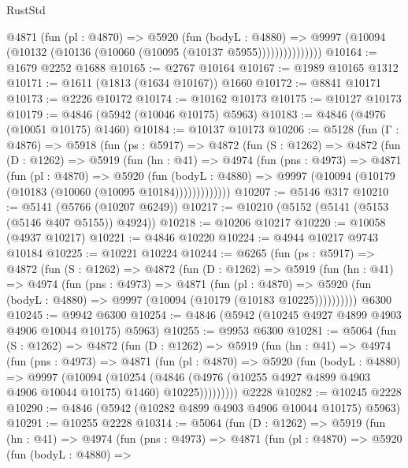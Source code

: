 \begin{lexlean}{RustStd}
\begin{coremodule}
                @4871
                  (fun (pl : @4870) =>
                  @5920
                    (fun (bodyL : @4880) =>
                    @9997 (@10094 (@10132 (@10136 (@10060 (@10095 (@10137 @5955)))))))))))))))
@10164 := @1679 @2252 @1688
@10165 := @2767 @10164
@10167 := @1989 @10165 @1312
@10171 := @1611 (@1813 (@1634 @10167)) @1660
@10172 := @8841 @10171
@10173 := @2226 @10172
@10174 := @10162 @10173
@10175 := @10127 @10173
@10179 := @4846 (@5942 (@10046 @10175) @5963)
@10183 := @4846 (@4976 (@10051 @10175) @1460)
@10184 := @10137 @10173
@10206 := @5128
    (fun (Γ : @4876) =>
    @5918
      (fun (ps : @5917) =>
      @4872
        (fun (S : @1262) =>
        @4872
          (fun (D : @1262) =>
          @5919
            (fun (hn : @41) =>
            @4974
              (fun (pns : @4973) =>
              @4871
                (fun (pl : @4870) =>
                @5920
                  (fun (bodyL : @4880) =>
                  @9997 (@10094 (@10179 (@10183 (@10060 (@10095 @10184)))))))))))))
@10207 := @5146 @317
@10210 := @5141 (@5766 (@10207 @6249))
@10217 := @10210 (@5152 (@5141 (@5153 (@5146 @407 @5155)) @4924))
@10218 := @10206 @10217
@10220 := @10058 (@4937 @10217)
@10221 := @4846 @10220
@10224 := @4944 @10217 @9743 @10184
@10225 := @10221 @10224
@10244 := @6265
    (fun (ps : @5917) =>
    @4872
      (fun (S : @1262) =>
      @4872
        (fun (D : @1262) =>
        @5919
          (fun (hn : @41) =>
          @4974
            (fun (pns : @4973) =>
            @4871
              (fun (pl : @4870) =>
              @5920 (fun (bodyL : @4880) => @9997 (@10094 (@10179 (@10183 @10225))))))))))
    @6300
@10245 := @9942 @6300
@10254 := @4846 (@5942 (@10245 @4927 @4899 @4903 @4906 @10044 @10175) @5963)
@10255 := @9953 @6300
@10281 := @5064
    (fun (S : @1262) =>
    @4872
      (fun (D : @1262) =>
      @5919
        (fun (hn : @41) =>
        @4974
          (fun (pns : @4973) =>
          @4871
            (fun (pl : @4870) =>
            @5920
              (fun (bodyL : @4880) =>
              @9997
                (@10094
                  (@10254
                    (@4846
                      (@4976 (@10255 @4927 @4899 @4903 @4906 @10044 @10175) @1460)
                      @10225)))))))))
    @2228
@10282 := @10245 @2228
@10290 := @4846 (@5942 (@10282 @4899 @4903 @4906 @10044 @10175) @5963)
@10291 := @10255 @2228
@10314 := @5064
    (fun (D : @1262) =>
    @5919
      (fun (hn : @41) =>
      @4974
        (fun (pns : @4973) =>
        @4871
          (fun (pl : @4870) =>
          @5920
            (fun (bodyL : @4880) =>

\end{coremodule}
\end{lexlean}
